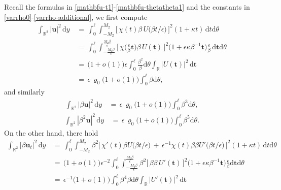 \documentclass[10pt, reqno]{amsart}
\numberwithin{equation}{section}
\theoremstyle{definition}
\begin{document}
{{\medskip
 Recall the formulas in \eqref{mathbfu-t1}-\eqref{mathbfu-thetatheta1} and the constants in \eqref{varrho0}-\eqref{varrho-additional}, we first compute
\begin{align}
 \int_{{\mathbb R}^2} |{\mathbf u}|^2 \,{\mathrm d} y
 &\,=\,
 \int_0^{\ell} \int_{-M_2}^{M_2}
 \Big[\,
 \chi(t)\beta\, U\big(\beta t/\epsilon\big)
 \, \Big]^2 (1+\kappa t )\,{\mathrm d}t{\mathrm d}\theta
\nonumber\\[2mm]
 &\,=\,
 \int_0^{\ell} \int_{-\frac{M_2\beta}{\epsilon}}^{\frac{M_2\beta}{\epsilon}}
 \Big[\, \chi\Big(\frac{\epsilon}{\beta}{\mathbf t}\Big)\beta\, U({\mathbf t})\, \Big]^2
 \big(1+\epsilon\kappa\beta^{-1}{\mathbf t}\big) \frac{\epsilon}{\beta} \,{\mathrm d}{\mathbf t}{\mathrm d}\theta
\nonumber\\[2mm]
 & \,=\, \big(1+o(1)\big)\epsilon\int_0^{\ell} \frac{\beta^2}{\beta} {\mathrm d}\theta \int_{\mathbb R} |U({\mathbf t})|^2 \,{\mathrm d}{\mathbf t}
\nonumber\\[2mm]
 & \,=\,
 \epsilon\, \varrho_0\big(1+o(1)\big)\int_0^{\ell} \beta {\mathrm d}\theta,
 \label{v1-L2norm-0}
\end{align}
 and similarly
\begin{align}
 \int_{{\mathbb R}^2} |\beta {\mathbf u}|^2 \,{\mathrm d} y
 & \,=\,
 \epsilon\, \varrho_0\big(1+o(1)\big)\int_0^{\ell} \beta^3 {\mathrm d}\theta,
 \label{v1-L2norm-1}
\end{align}
\begin{align}
 \int_{{\mathbb R}^2} |\beta^2 {\mathbf u}|^2 \,{\mathrm d} y
 & \,=\,
 \epsilon\, \varrho_0\big(1+o(1)\big)\int_0^{\ell} \beta^5 {\mathrm d}\theta.
 \label{v1-L2norm-2}
\end{align}
 On the other hand, there hold
\begin{align}
 \int_{{\mathbb R}^2} | \beta{\mathbf u}_t|^2 \,{\mathrm d} y
 &\,=\,
 \int_0^{\ell} \int_{-M_2}^{M_2} \beta^2
 \Big[\,
 \chi'(t)\beta U\big(\beta t/\epsilon\big)
 \,+\,
 \epsilon^{-1}\chi(t)\beta\beta U'\big(\beta t/\epsilon\big)
 \,\Big]^2 (1+\kappa t )\,{\mathrm d}t{\mathrm d}\theta
\nonumber\\[2mm]
 &\,=\,
 \big(1+o(1)\big)\epsilon^{-2}\int_0^{\ell} \int_{-\frac{M_2\beta}{\epsilon}}^{\frac{M_2\beta}{\epsilon}}
 \beta^2
 \Big[\, \beta\beta\, U'({\mathbf t})\, \Big]^2
 \big(1+\epsilon\kappa\beta^{-1}{\mathbf t}\big)\frac{\epsilon}{\beta}{\mathrm d}{\mathbf t}{\mathrm d}\theta
\nonumber\\[2mm]
 & \,=\, \epsilon^{-1}\big(1+o(1)\big)\int_0^{\ell} \beta^4\beta {\mathrm d}\theta \int_{\mathbb R} |U'({\mathbf t})|^2 \,{\mathrm d}{\mathbf t}

\end{align}}}
\end{document}

